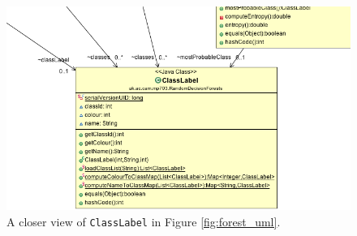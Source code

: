 \documentclass[12pt,twoside,notitlepage]{report}
\begin{document}
                \begin{figure}[H]
                    \centering
                    \includegraphics[scale=0.5]{ClassLabel_Forest_UML}
                    \caption{A closer view of \texttt{ClassLabel} in Figure \ref{fig:forest_uml}.}
                    \label{fig:class_label_uml}
                \end{figure}
\end{document}
